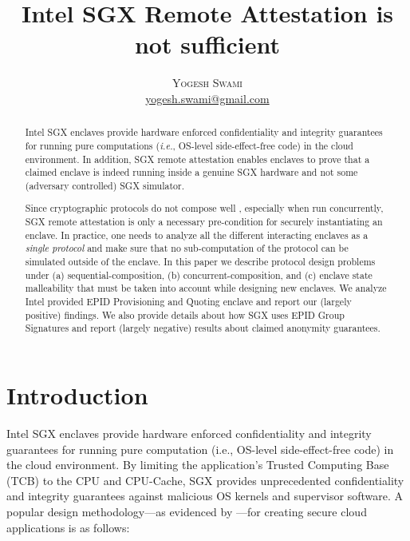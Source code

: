 \documentclass[letterpaper]{article}
\title{\bf Intel SGX Remote Attestation is not sufficient}
\author{\textsc{Yogesh Swami}\\\small{\url{yogesh.swami@gmail.com}}}
\date{\lastupdate}
\newcommand{\ie}{\textit{i.e.}}
\begin{document}

\maketitle

\begin{abstract}
  Intel SGX enclaves provide hardware enforced confidentiality and
  integrity guarantees for running pure computations (\ie, OS-level
  side-effect-free code) in the cloud environment. In addition, SGX
  remote attestation enables enclaves to prove that a claimed enclave
  is indeed running inside a genuine SGX hardware and not some
  (adversary controlled) SGX simulator.

  Since cryptographic protocols do not compose well
  \cite{cramerthesis,ucframework,gnuc}, especially when run
  concurrently, SGX remote attestation is only a necessary
  pre-condition for securely instantiating an enclave. In practice,
  one needs to analyze all the different interacting enclaves as a
  \textit{single protocol} and make sure that no sub-computation of
  the protocol can be simulated outside of the enclave. In this paper
  we describe protocol design problems under (a)
  sequential-composition, (b) concurrent-composition, and (c) enclave
  state malleability that must be taken into account while designing
  new enclaves. We analyze Intel provided EPID \cite{epid}
  \textsf{Provisioning} and \textsf{Quoting} enclave \cite{sgxattest}
  and report our (largely positive) findings. We also provide details
  about how SGX uses EPID Group Signatures and report (largely
  negative) results about claimed anonymity guarantees.

\end{abstract}

\section{Introduction}
\label{sec:intro}
  Intel SGX enclaves\cite{sgxinnov, sgxinnov2} provide hardware
  enforced confidentiality and integrity guarantees for running pure
  computation (i.e., OS-level side-effect-free code) in the
  cloud environment. By limiting the application's Trusted Computing
  Base (TCB) to the CPU and CPU-Cache, SGX provides unprecedented
  confidentiality and integrity guarantees against malicious OS
  kernels and supervisor software. A popular design methodology---as
  evidenced by \cite{Haven, Graphene, Scone}---for creating secure
  cloud applications is as follows:
\end{document}
